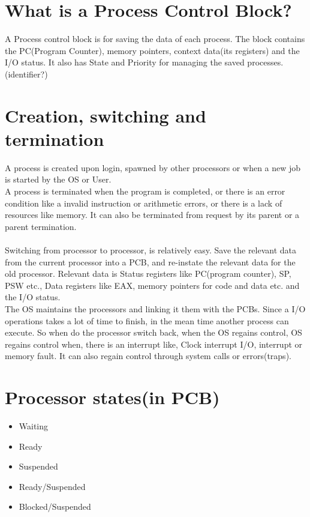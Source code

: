 \documentclass{report}
\begin{document}
\section{What is a Process Control Block?}
A Process control block is for saving the data of each process. The block contains the PC(Program Counter), memory pointers, context data(its registers) and the I/O status. It also has State and Priority for managing the saved processes.(identifier?)
\newpage
\section{Creation, switching and termination}
A process is created upon login, spawned by other processors or when a new job is started by the OS or User.
\\
A process is terminated when the program is completed, or there is an error condition like a invalid instruction or arithmetic errors, or there is a lack of resources like memory. It can also be terminated from request by its parent or a parent termination.
\\\\
Switching from processor to processor, is relatively easy. Save the relevant data from the current processor into a PCB, and re-instate the relevant data for the old processor. Relevant data is Status registers like PC(program counter), SP, PSW etc., Data registers like EAX, memory pointers for code and data etc. and the I/O status.
\\
The OS maintains the processors and linking it them with the PCBs. Since a I/O operations takes a lot of time to finish, in the mean time another process can execute. So when do the processor switch back, when the OS regains control, OS regains control when, there is an interrupt like, Clock interrupt I/O, interrupt or memory fault. It can also regain control through system calls or errors(traps).

\section{Processor states(in PCB)}
\begin{itemize}
\item Waiting
\item Ready
\item Suspended
\item Ready/Suspended
\item Blocked/Suspended
\end{itemize}
\end{document}
